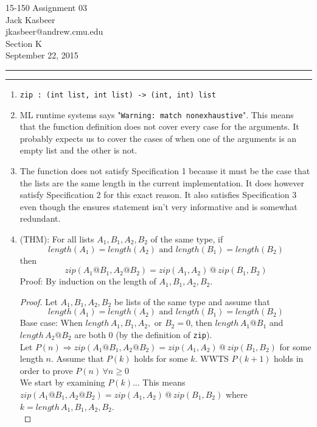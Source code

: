 \documentclass[11pt]{article}
\makeatletter
\newcommand{\question}[2] {\vspace{.25in} \hrule\vspace{0.5em}
\noindent{\bf #1: #2} \vspace{0.5em}
\hrule \vspace{.10in}}
\newcommand{\myname}{Jack Kasbeer}
\newcommand{\myandrew}{jkasbeer@andrew.cmu.edu}
\newcommand{\myhwnum}{03}
\makeatother
\begin{document}
\medskip            
\thispagestyle{plain}
\begin{center} 
{\Large 15-150 Assignment \myhwnum} \\
\myname \\
\myandrew \\
Section K \\
September 22, 2015 \\
\end{center}

\question{2}{Zippidy Doo Da}
\begin{enumerate}
\item \verb|zip : (int list, int list) -> (int, int) list|
\item ML runtime systems says "\verb|Warning: match nonexhaustive|".  This means that the function definition does not cover every case for the arguments.  It probably expects us to cover the cases of when one of the arguments is an empty list and the other is not.
\item The function does not satisfy Specification 1 because it must be the case that the lists are the same length in the current implementation.  It does however satisfy Specification 2 for this exact reason.  It also satisfies Specification 3 even though the ensures statement isn't very informative and is somewhat redundant.
\item (THM): For all lists $A_1, B_1, A_2, B_2$ of the same type, if 
\[ length(A_1) = length(A_2) \text{ and } length(B_1) = length(B_2) \]
then
\[ zip(A_1 @ B_1, A_2 @ B_2) = zip(A_1, A_2)\, @\, zip(B_1, B_2) \]
Proof: By induction on the length of $A_1, B_1, A_2, B_2$.
\begin{proof}
Let $A_1, B_1, A_2, B_2$ be lists of the same type and assume that \[ length(A_1) = length(A_2) \text{ and } length(B_1) = length(B_2) \]
Base case: When $length\, A_1, B_1, A_2,$ or $B_2 = 0$, then $length \, A_1@B_1$ and $length \, A_2 @ B_2$ are both $0$ (by the definition of \verb|zip|).\\
Let $P(n) \Rightarrow zip(A_1 @ B_1, A_2 @ B_2) = zip(A_1, A_2)\, @\, zip(B_1, B_2)$ for some length $n$.  Assume that $P(k)$ holds for some $k$.  WWTS $P(k+1)$ holds in order to prove $P(n) \, \forall n \geq 0$\\
We start by examining $P(k)$... This means $zip(A_1 @ B_1, A_2 @ B_2) = zip(A_1, A_2)\, @\, zip(B_1, B_2)$ where $k = length\, A_1, B_1, A_2, B_2$.\\
\end{proof}
\end{enumerate}
\end{document}
